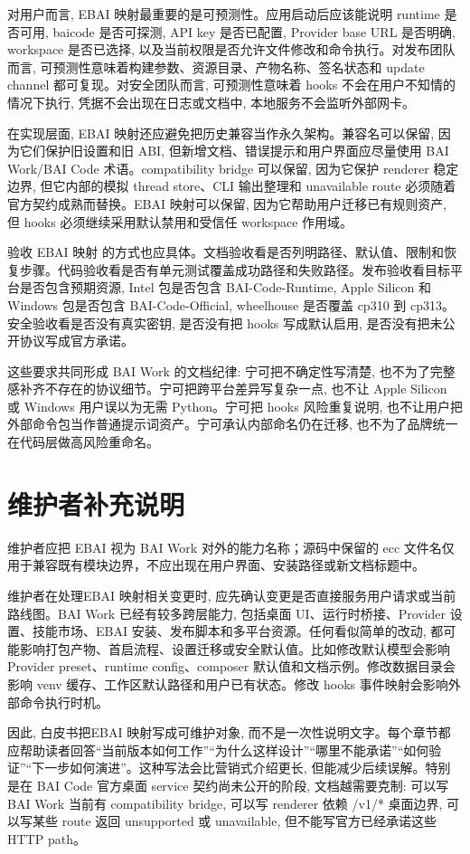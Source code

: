 对用户而言, EBAI 映射最重要的是可预测性。应用启动后应该能说明 runtime 是否可用, baicode 是否可探测, API key 是否已配置, Provider base URL 是否明确, workspace 是否已选择, 以及当前权限是否允许文件修改和命令执行。对发布团队而言, 可预测性意味着构建参数、资源目录、产物名称、签名状态和 update channel 都可复现。对安全团队而言, 可预测性意味着 hooks 不会在用户不知情的情况下执行, 凭据不会出现在日志或文档中, 本地服务不会监听外部网卡。

在实现层面, EBAI 映射还应避免把历史兼容当作永久架构。兼容名可以保留, 因为它们保护旧设置和旧 ABI, 但新增文档、错误提示和用户界面应尽量使用 BAI Work/BAI Code 术语。compatibility bridge 可以保留, 因为它保护 renderer 稳定边界, 但它内部的模拟 thread store、CLI 输出整理和 unavailable route 必须随着官方契约成熟而替换。EBAI 映射可以保留, 因为它帮助用户迁移已有规则资产, 但 hooks 必须继续采用默认禁用和受信任 workspace 作用域。

验收 EBAI 映射 的方式也应具体。文档验收看是否列明路径、默认值、限制和恢复步骤。代码验收看是否有单元测试覆盖成功路径和失败路径。发布验收看目标平台是否包含预期资源, Intel 包是否包含 BAI-Code-Runtime, Apple Silicon 和 Windows 包是否包含 BAI-Code-Official, wheelhouse 是否覆盖 cp310 到 cp313。安全验收看是否没有真实密钥, 是否没有把 hooks 写成默认启用, 是否没有把未公开协议写成官方承诺。

这些要求共同形成 BAI Work 的文档纪律: 宁可把不确定性写清楚, 也不为了完整感补齐不存在的协议细节。宁可把跨平台差异写复杂一点, 也不让 Apple Silicon 或 Windows 用户误以为无需 Python。宁可把 hooks 风险重复说明, 也不让用户把外部命令包当作普通提示词资产。宁可承认内部命名仍在迁移, 也不为了品牌统一在代码层做高风险重命名。

\section{维护者补充说明}
维护者应把 EBAI 视为 BAI Work 对外的能力名称；源码中保留的 ecc 文件名仅用于兼容既有模块边界，不应出现在用户界面、安装路径或新文档标题中。

维护者在处理EBAI 映射相关变更时, 应先确认变更是否直接服务用户请求或当前路线图。BAI Work 已经有较多跨层能力, 包括桌面 UI、运行时桥接、Provider 设置、技能市场、EBAI 安装、发布脚本和多平台资源。任何看似简单的改动, 都可能影响打包产物、首启流程、设置迁移或安全默认值。比如修改默认模型会影响 Provider preset、runtime config、composer 默认值和文档示例。修改数据目录会影响 venv 缓存、工作区默认路径和用户已有状态。修改 hooks 事件映射会影响外部命令执行时机。

因此, 白皮书把EBAI 映射写成可维护对象, 而不是一次性说明文字。每个章节都应帮助读者回答“当前版本如何工作”“为什么这样设计”“哪里不能承诺”“如何验证”“下一步如何演进”。这种写法会比营销式介绍更长, 但能减少后续误解。特别是在 BAI Code 官方桌面 service 契约尚未公开的阶段, 文档越需要克制: 可以写 BAI Work 当前有 compatibility bridge, 可以写 renderer 依赖 /v1/* 桌面边界, 可以写某些 route 返回 unsupported 或 unavailable, 但不能写官方已经承诺这些 HTTP path。

